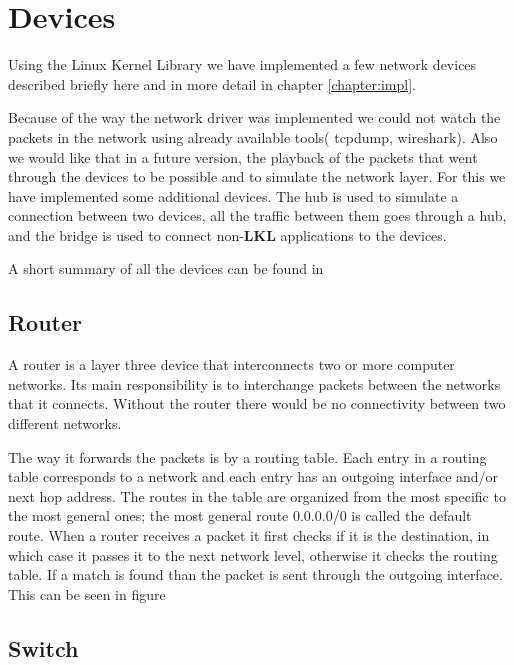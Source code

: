 
\section{Devices}
\label{sec:devices}

Using the Linux Kernel Library we have implemented a few network devices described briefly
here and in more detail in chapter \ref{chapter:impl}.

Because of the way the network driver was implemented we could not watch the packets in the
network using already available tools( tcpdump, wireshark). Also we would like that in a future version,
the playback of the packets that went through the devices to be possible and to simulate the network layer.
For this we have implemented some additional devices. The hub is used to simulate a connection between 
two devices, all the traffic between them goes through a hub, and the bridge is used to connect non-\textbf{LKL} 
applications to the \text{\project} devices.

A short summary of all the devices can be found in 

\subsection{Router}
\label{sub-sec:router}

A router is a layer three device that interconnects two or more computer networks. Its main responsibility
is to interchange packets between the networks that it connects. Without the router there would be no connectivity 
between two different networks.

The way it forwards the packets is by a routing table. Each entry in a routing table corresponds to a network
and each entry has an outgoing interface and/or next hop address. The routes in the table are organized from the most specific
to the most general ones; the most general route 0.0.0.0/0 is called the default route. When a router receives a packet it 
first checks if it is the destination, in which case it passes it to the next network level, otherwise it checks the routing
table. If a match is found than the packet is sent through the outgoing interface. This can be seen in figure 


\subsection{Switch}
\label{sub-sec:switch}

